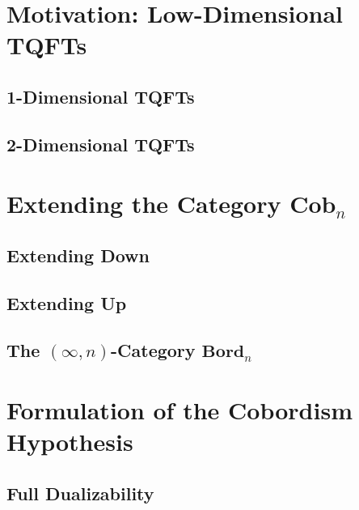 \documentclass[a4paper,11pt,psamsfonts,reqno]{amsbook}
\newcounter{prpcounter}
\theoremstyle{proposition}
\theoremstyle{proof}
\begin{document}
\chapter{Motivation: Low-Dimensional TQFTs}
\label{chap:lowdimtqft}



\section{1-Dimensional TQFTs}
\label{sec:1dimtqft}



\section{2-Dimensional TQFTs}
\label{sec:2dimtqft}




\chapter{Extending the Category $\mathbf{Cob}_{n}$}
\label{chap:extcob}



\section{Extending Down}
\label{sec:extdown}



\section{Extending Up}
\label{sec:extup}



\section{The $(\infty,n)$-Category $\mathbf{Bord}_{n}$}
\label{sec:bordn}




\chapter{Formulation of the Cobordism Hypothesis}
\label{chap:formcobhyp}



\section{Full Dualizability}
\label{sec:fulldual}

\end{document}
